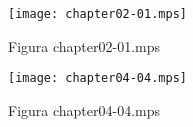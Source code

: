 \documentclass[a4paper]{article}
\begin{document}
\begin{figure}[htbp]
	\begin{center}
		\texttt{[image: chapter02-01.mps]}
	\end{center}
	\caption{Figura chapter02-01.mps}
\end{figure}

\begin{figure}[htpb]
	\begin{center}
		\texttt{[image: chapter04-04.mps]}
	\end{center}
	\caption{Figura chapter04-04.mps}
\end{figure}
\end{document}
